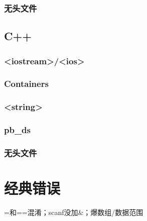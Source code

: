 \documentclass[10pt]{article}
\begin{document}
\subsubsection{无头文件}


\subsection{C++}
\subsubsection{<iostream>/<ios>}

\subsubsection{Containers}

\subsubsection{<string>}

%
%
%
\subsubsection{pb\_ds}

\subsubsection{无头文件}

\section{经典错误}
=和==混淆；scanf没加\&；爆数组/数据范围
\end{document}
